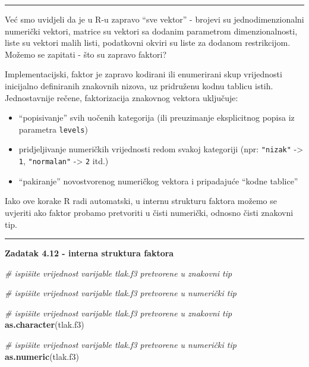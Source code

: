 \documentclass[]{book}
\newenvironment{Shaded}{\begin{snugshade}}{\end{snugshade}}
\newcommand{\KeywordTok}[1]{\textcolor[rgb]{0.13,0.29,0.53}{\textbf{#1}}}
\newcommand{\CommentTok}[1]{\textcolor[rgb]{0.56,0.35,0.01}{\textit{#1}}}
\newcommand{\NormalTok}[1]{#1}
\providecommand{\tightlist}{%
  \setlength{\itemsep}{0pt}\setlength{\parskip}{0pt}}
\theoremstyle{definition}
\theoremstyle{definition}
\theoremstyle{definition}
\theoremstyle{remark}
\begin{document}
\begin{center}\rule{0.5\linewidth}{\linethickness}\end{center}

Već smo uvidjeli da je u R-u zapravo ``sve vektor'' - brojevi su
jednodimenzionalni numerički vektori, matrice su vektori sa dodanim
parametrom dimenzionalnosti, liste su vektori malih listi, podatkovni
okviri su liste za dodanom restrikcijom. Možemo se zapitati - što su
zapravo faktori?

Implementacijski, faktor je zapravo kodirani ili enumerirani skup
vrijednosti inicijalno definiranih znakovnih nizova, uz pridruženu kodnu
tablicu istih. Jednostavnije rečene, faktorizacija znakovnog vektora
uključuje:

\begin{itemize}
\tightlist
\item
  ``popisivanje'' svih uočenih kategorija (ili preuzimanje eksplicitnog
  popisa iz parametra \texttt{levels})
\item
  pridjeljivanje numeričkih vrijednosti redom svakoj kategoriji (npr:
  \texttt{"nizak"} -\textgreater{} \texttt{1}, \texttt{"normalan"}
  -\textgreater{} \texttt{2} itd.)
\item
  ``pakiranje'' novostvorenog numeričkog vektora i pripadajuće ``kodne
  tablice''
\end{itemize}

Iako ove korake R radi automatski, u internu strukturu faktora možemo se
uvjeriti ako faktor probamo pretvoriti u čisti numerički, odnosno čisti
znakovni tip.

\begin{center}\rule{0.5\linewidth}{\linethickness}\end{center}

\textbf{Zadatak 4.12 - interna struktura faktora}

\begin{Shaded}
\begin{Highlighting}[]
\CommentTok{# ispišite vrijednost varijable tlak.f3 pretvorene u znakovni tip}

\CommentTok{# ispišite vrijednost varijable tlak.f3 pretvorene u numerički tip}
\end{Highlighting}
\end{Shaded}

\begin{Shaded}
\begin{Highlighting}[]
\CommentTok{# ispišite vrijednost varijable tlak.f3 pretvorene u znakovni tip}
\KeywordTok{as.character}\NormalTok{(tlak.f3)}

\CommentTok{# ispišite vrijednost varijable tlak.f3 pretvorene u numerički tip}
\KeywordTok{as.numeric}\NormalTok{(tlak.f3)}
\end{Highlighting}
\end{Shaded}
\end{document}
